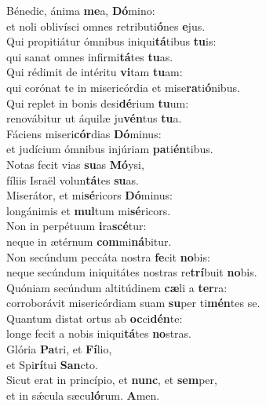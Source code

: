 \evenverse Bénedic, ánima \textbf{me}a, \textbf{Dó}mino:~\*\\
\evenverse et noli oblivísci omnes retributi\textbf{ó}nes \textbf{e}jus.\\
\oddverse Qui propitiátur ómnibus iniqui\textbf{tá}tibus \textbf{tu}is:~\*\\
\oddverse qui sanat omnes infirmi\textbf{tá}tes \textbf{tu}as.\\
\evenverse Qui rédimit de intéritu \textbf{vi}tam \textbf{tu}am:~\*\\
\evenverse qui corónat te in misericórdia et mise\textbf{ra}ti\textbf{ó}nibus.\\
\oddverse Qui replet in bonis desi\textbf{dé}rium \textbf{tu}um:~\*\\
\oddverse renovábitur ut áquilæ ju\textbf{vén}tus \textbf{tu}a.\\
\evenverse Fáciens miseri\textbf{cór}dias \textbf{Dó}minus:~\*\\
\evenverse et judícium ómnibus injúriam \textbf{pa}ti\textbf{én}tibus.\\
\oddverse Notas fecit vias \textbf{su}as \textbf{Mó}ysi,~\*\\
\oddverse fíliis Israël volun\textbf{tá}tes \textbf{su}as.\\
\evenverse Miserátor, et mi\textbf{sé}ricors \textbf{Dó}minus:~\*\\
\evenverse longánimis et \textbf{mul}tum mi\textbf{sé}ricors.\\
\oddverse Non in perpétuum \textbf{i}ra\textbf{scé}tur:~\*\\
\oddverse neque in ætérnum \textbf{com}mi\textbf{ná}bitur.\\
\evenverse Non secúndum peccáta nostra \textbf{fe}cit \textbf{no}bis:~\*\\
\evenverse neque secúndum iniquitátes nostras re\textbf{trí}buit \textbf{no}bis.\\
\oddverse Quóniam secúndum altitúdinem \textbf{cæ}li a \textbf{ter}ra:~\*\\
\oddverse corroborávit misericórdiam suam \textbf{su}per ti\textbf{mén}tes se.\\
\evenverse Quantum distat ortus ab \textbf{oc}ci\textbf{dén}te:~\*\\
\evenverse longe fecit a nobis iniqui\textbf{tá}tes \textbf{no}stras.\\
\oddverse Glória \textbf{Pa}tri, et \textbf{Fí}lio,~\*\\
\oddverse et Spi\textbf{rí}tui \textbf{San}cto.\\
\evenverse Sicut erat in princípio, et \textbf{nunc}, et \textbf{sem}per,~\*\\
\evenverse et in sǽcula sæcu\textbf{ló}rum. \textbf{A}men.\\
